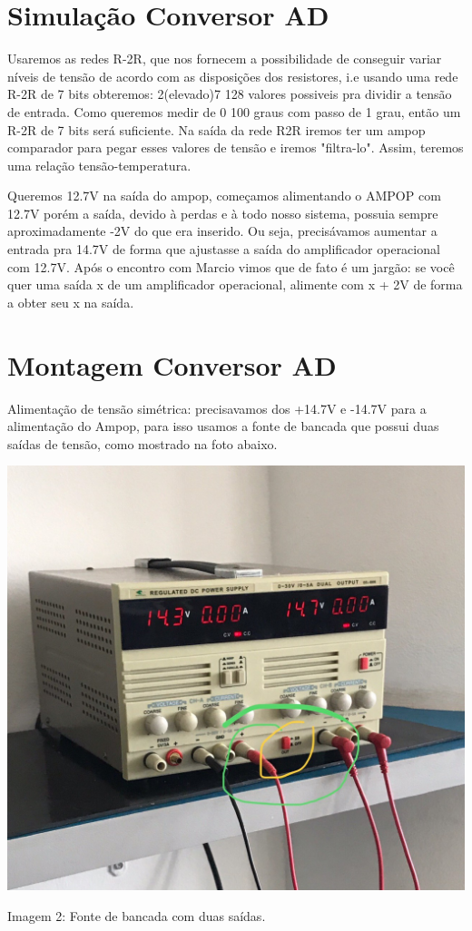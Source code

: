 \documentclass{article}
\begin{document}
\section{Simulação Conversor AD}
Usaremos as redes R-2R, que nos fornecem a possibilidade de conseguir variar níveis de tensão de acordo com as disposições dos resistores, i.e usando uma rede R-2R de 7 bits obteremos: 2(elevado)7 128 valores possiveis pra dividir a tensão de entrada. Como queremos medir de 0 100 graus com passo de 1 grau, então um R-2R de 7 bits será suficiente. Na saída da rede R2R iremos ter um ampop comparador para pegar esses valores de tensão e iremos "filtra-lo". Assim, teremos uma relação tensão-temperatura.

Queremos 12.7V na saída do ampop, começamos alimentando o AMPOP com 12.7V porém a saída, devido à perdas e à todo nosso sistema, possuia sempre aproximadamente -2V do que era inserido. Ou seja, precisávamos aumentar a entrada pra 14.7V de forma que ajustasse a saída do amplificador operacional com 12.7V. Após o encontro com Marcio vimos que de fato é um jargão: se você quer uma saída x de um amplificador operacional, alimente com x + 2V de forma a obter seu x na saída.



\section{Montagem Conversor AD}
Alimentação de tensão simétrica: precisavamos dos +14.7V e -14.7V para a alimentação do Ampop, para isso usamos a fonte de bancada que possui duas saídas de tensão, como mostrado na foto abaixo.
\begin{center}
    \includegraphics[scale=0.2]{images/fonte.jpeg}
    
    Imagem 2: Fonte de bancada com duas saídas.
\end{center}
\end{document}
